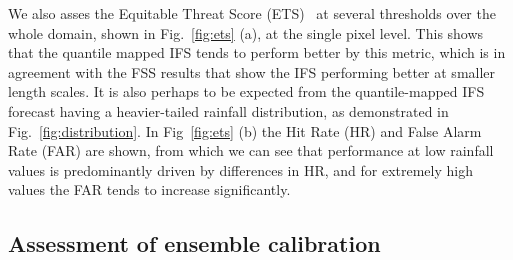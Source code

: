 \documentclass{article}
\begin{document}
We also asses the Equitable Threat Score (ETS)~\citep{schaefer_critical_1990, wilks_forecast_2019} at several thresholds over the whole domain, shown in Fig.~\ref{fig:ets} (a), at the single pixel level. This shows that the quantile mapped IFS tends to perform better by this metric, which is in agreement with the FSS results that show the IFS performing better at smaller length scales. It is also perhaps to be expected from the quantile-mapped IFS forecast having a heavier-tailed rainfall distribution, as demonstrated in Fig.~\ref{fig:distribution}. In Fig~\ref{fig:ets} (b) the Hit Rate (HR) and False Alarm Rate (FAR) are shown, from which we can see that performance at low rainfall values is predominantly driven by differences in HR, and for extremely high values the FAR tends to increase significantly.


        
\subsection{Assessment of ensemble calibration}
\end{document}
